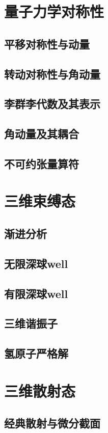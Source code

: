 \documentclass[a4paper,11pt]{article}
\theoremstyle{mystyle}
\begin{document}
\section{量子力学对称性}
\subsection{平移对称性与动量}
\subsection{转动对称性与角动量}
\subsection{李群李代数及其表示}
\subsection{角动量及其耦合}
\subsection{不可约张量算符}
\section{三维束缚态}
\subsection{渐进分析}
\subsection{无限深球well}
\subsection{有限深球well}
\subsection{三维谐振子}
\subsection{氢原子严格解}
\section{三维散射态}
\subsection{经典散射与微分截面}
\end{document}
